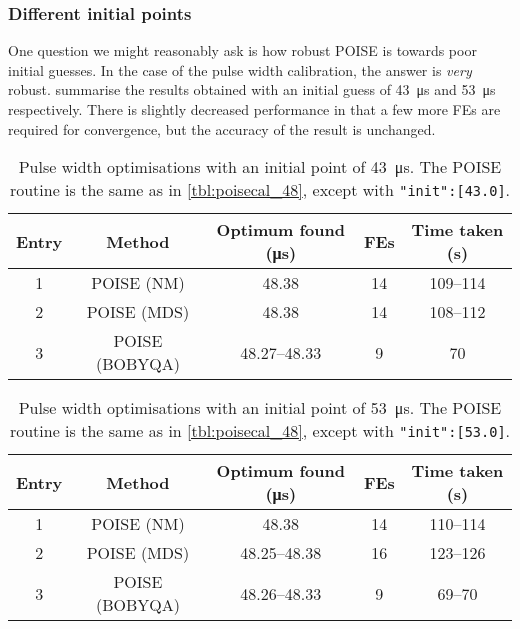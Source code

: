 \subsubsection{Different initial points}

One question we might reasonably ask is how robust POISE is towards poor initial guesses.
In the case of the pulse width calibration, the answer is \textit{very} robust.
 summarise the results obtained with an initial guess of \qty{43}{\us} and \qty{53}{\us} respectively.
There is slightly decreased performance in that a few more FEs are required for convergence, but the accuracy of the result is unchanged.

\begin{table}[htb]
    \centering
    \begin{tabular}{ccccc}
        \toprule
        Entry & Method      & Optimum found (\unit{\us}) & FEs & Time taken (\unit{\s}) \\
        \midrule
        1 & POISE (NM)     & 48.38        & 14 & 109--114 \\
        2 & POISE (MDS)    & 48.38        & 14 & 108--112  \\
        3 & POISE (BOBYQA) & 48.27--48.33 & 9  & 70       \\
        \bottomrule
    \end{tabular}
    \caption[Pulse width calibrations using initial guess of \qty{43}{\us}]{
        Pulse width optimisations with an initial point of \qty{43}{\us}.
        The POISE routine is the same as in \cref{tbl:poisecal_48}, except with \texttt{"init":[43.0]}.
    }
    \label{tbl:poisecal_43}
\end{table}

\begin{table}[htb]
    \centering
    \begin{tabular}{ccccc}
        \toprule
        Entry & Method      & Optimum found (\unit{\us}) & FEs & Time taken (\unit{\s}) \\
        \midrule
        1 & POISE (NM)     & 48.38        & 14 & 110--114 \\
        2 & POISE (MDS)    & 48.25--48.38 & 16 & 123--126 \\
        3 & POISE (BOBYQA) & 48.26--48.33 & 9  & 69--70   \\
        \bottomrule
    \end{tabular}
    \caption[Pulse width calibrations using initial guess of \qty{53}{\us}]{
        Pulse width optimisations with an initial point of \qty{53}{\us}.
        The POISE routine is the same as in \cref{tbl:poisecal_48}, except with \texttt{"init":[53.0]}.
    }
    \label{tbl:poisecal_53}
\end{table}

